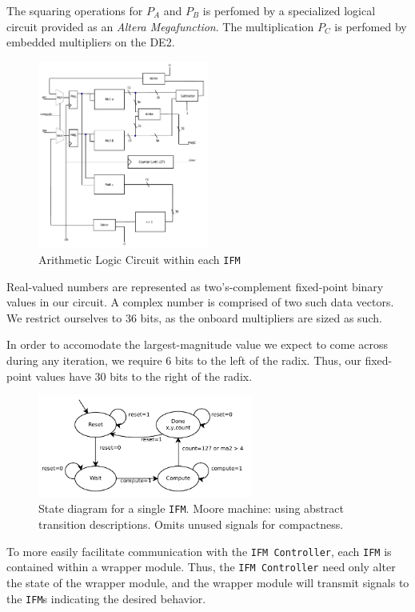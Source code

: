\documentclass{article}
\begin{document}
The squaring operations for $P_A$ and $P_B$ is perfomed by a specialized logical circuit provided as an \textit{Altera Megafunction}. The multiplication $P_C$ is perfomed by embedded multipliers on the DE2.

\begin{figure}[H]
  \centering
    \includegraphics[width=160pt]{block_diagrams/ifm.pdf}
  \caption{Arithmetic Logic Circuit within each \texttt{IFM}}
\end{figure}

Real-valued numbers are represented as two's-complement fixed-point binary
values in our circuit. A complex number is comprised of two such data vectors. 
We restrict ourselves to 36 bits, as the onboard multipliers
are sized as such. 

In order to accomodate the largest-magnitude value we
expect to come across during any iteration, we require 6 bits to the
left of the radix. Thus, our fixed-point values have 30 bits to the
right of the radix.

\begin{figure}[H]
  \centering
    \includegraphics[width=200pt]{state_diagrams/ifm.pdf}
  \caption{State diagram for a single \texttt{IFM}. Moore
    machine: using abstract transition descriptions. Omits unused
    signals for compactness.}
\end{figure}


To more easily facilitate communication with the \texttt{IFM Controller}, each \texttt{IFM} is contained within a wrapper module.
Thus, the \texttt{IFM Controller} need only alter the state of the wrapper module, and the wrapper module will transmit signals to the \texttt{IFM}s indicating the desired behavior.
\end{document}

